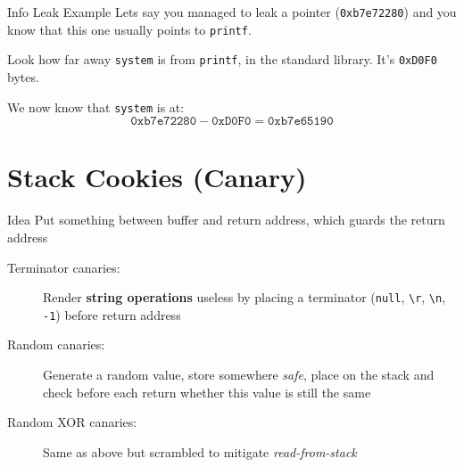 \documentclass[beamer]{uibk}
\begin{document}
\begin{frame}{Info Leak Example}
    Lets say you managed to leak a pointer (\texttt{0xb7e72280}) and you know
    that this one usually points to \texttt{printf}.
    \bigskip

    Look how far away \texttt{system} is from \texttt{printf}, in the standard
    library. It's \texttt{0xD0F0} bytes.
    \bigskip

    We now know that \texttt{system} is at:
    \[ \mathtt{0xb7e72280} - \mathtt{0xD0F0} = \mathtt{0xb7e65190} \]
\end{frame}

\section{Stack Cookies (Canary)}

\begin{frame}{Idea}
    Put something between buffer and return address, which guards the return
    address
    \bigskip
    \pause
    \begin{description}
        \item[Terminator canaries:] Render \textbf{string operations}
            useless by placing a terminator (\texttt{null},
            \texttt{\textbackslash r}, \texttt{\textbackslash n},
            \texttt{-1}) before return address
        \medskip
        \item [Random canaries:] Generate a random value, store somewhere
            \textit{safe}, place on the stack and check before each return
            whether this value is still the same
        \medskip
        \item [Random XOR canaries:] Same as above but scrambled to mitigate
            \textit{read-from-stack}
    \end{description}
\end{frame}
\end{document}
